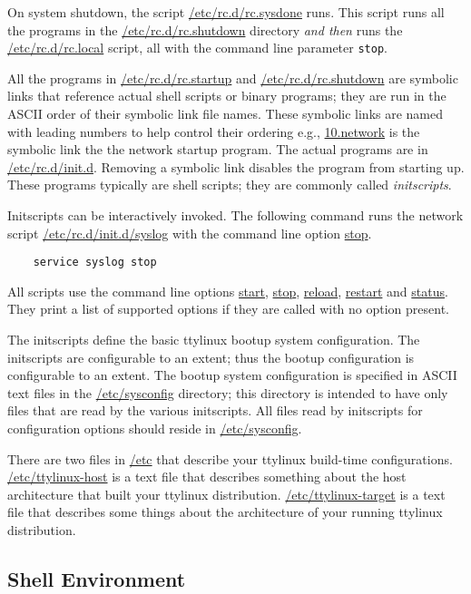 \documentclass[10pt]{article}
\begin{document}
On system shutdown, the script \url{/etc/rc.d/rc.sysdone} runs. This script
runs all the programs in the \url{/etc/rc.d/rc.shutdown} directory {\it and
then} runs the \url{/etc/rc.d/rc.local} script, all with the command line
parameter {\tt stop}.

All the programs in \url{/etc/rc.d/rc.startup} and \url{/etc/rc.d/rc.shutdown}
are symbolic links that reference actual shell scripts or binary programs; they
are run in the ASCII order of their symbolic link file names. These symbolic
links are named with leading numbers to help control their ordering e.g.,
\url{10.network} is the symbolic link the the network startup program. The
actual programs are in \url{/etc/rc.d/init.d}. Removing a symbolic link
disables the program from starting up. These programs typically are shell
scripts; they are commonly called {\it initscripts}.

Initscripts can be interactively invoked. The following command runs the network
script \url{/etc/rc.d/init.d/syslog} with the command line option \url{stop}.

\begin{lstlisting}
	service syslog stop
\end{lstlisting}

All scripts use the command line options \url{start}, \url{stop}, \url{reload},
\url{restart} and \url{status}. They print a list of supported options if they
are called with no option present.

The initscripts define the basic ttylinux bootup system configuration. The
initscripts are configurable to an extent; thus the bootup configuration is
configurable to an extent. The bootup system configuration is specified in
ASCII text files in the \url{/etc/sysconfig} directory; this directory is
intended to have only files that are read by the various initscripts. All files
read by initscripts for configuration options should reside in
\url{/etc/sysconfig}.

There are two files in \url{/etc} that describe your ttylinux build-time
configurations. \url{/etc/ttylinux-host} is a text file that describes
something about the host architecture that built your ttylinux distribution.
\url{/etc/ttylinux-target} is a text file that describes some things about the
architecture of your running ttylinux distribution.

\subsection{Shell Environment}
\end{document}
